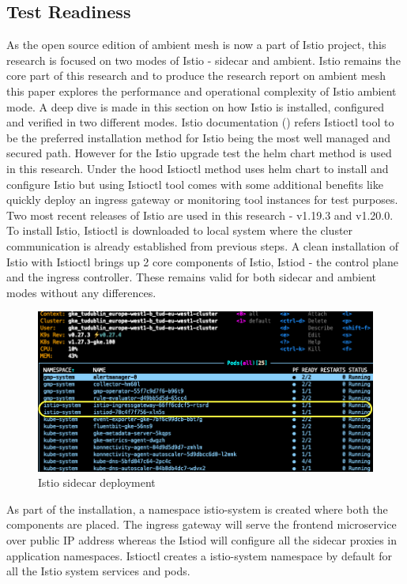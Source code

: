 \subsection{Test Readiness}
As the open source edition of ambient mesh is now a part of Istio project, this research is focused on two modes of Istio - sidecar and ambient. Istio remains the core part of this research and to produce the research report on ambient mesh this paper explores the performance and operational complexity of Istio ambient mode. A deep dive is made in this section on how Istio is installed, configured and verified in two different modes. Istio documentation (\cite{istioDocInstall}) refers Istioctl tool to be the preferred installation method for Istio being the most well managed and secured path. However for the Istio upgrade test the helm chart method is used in this research. Under the hood Istioctl method uses helm chart to install and configure Istio but using Istioctl tool comes with some additional benefits like quickly deploy an ingress gateway or monitoring tool instances for test purposes. Two most recent releases of Istio are used in this research - v1.19.3 and v1.20.0. To install Istio, Istioctl is downloaded to local system where the cluster communication is already established from previous steps. A clean installation of Istio with Istioctl brings up 2 core components of Istio, Istiod - the control plane and the ingress controller. These remains valid for both sidecar and ambient modes without any differences.

\begin{figure}[ht!]
    \centering
    \includegraphics[width=1.0\linewidth]{resources/istio-std-installed.png}
    \caption{Istio sidecar deployment}
    \label{method:istioStdInstalledView}
\end{figure}

As part of the installation, a namespace istio-system is created where both the components are placed. The ingress gateway will serve the frontend microservice over public IP address whereas the Istiod will configure all the sidecar proxies in application namespaces. Istioctl creates a istio-system namespace by default for all the Istio system services and pods.


